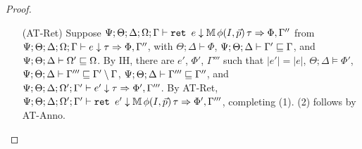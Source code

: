 \begin{proof}
\begin{itemize}
  \item[(AT-Ret)] Suppose
  $\Psi ; \Theta ; \Delta ; \Omega ; \Gamma \vdash \texttt{ret } e \downarrow \mathbb{M} \, \phi(I,\vec{p}) \, \tau \Rightarrow \Phi, \Gamma''$ from
  $\Psi ; \Theta ; \Delta ; \Omega ; \Gamma \vdash e \downarrow \tau \Rightarrow \Phi,\Gamma''$, with
  $\Theta ; \Delta \vdash \Phi$,
  $\Psi ; \Theta ; \Delta \vdash \Gamma' \sqsubseteq \Gamma$, and
  $\Psi ; \Theta ; \Delta \vdash \Omega' \sqsubseteq \Omega$.
  By IH, there are $e'$, $\Phi'$, $\Gamma'''$ such that 
  $|e'| = |e|$,
  $\Theta ; \Delta \vDash \Phi'$,
  $\Psi ;  \Theta ; \Delta \vdash \Gamma''' \sqsubseteq \Gamma' \setminus \Gamma$,
  $\Psi ;  \Theta ; \Delta \vdash \Gamma''' \sqsubseteq \Gamma''$, and
  $\Psi ; \Theta ; \Delta ; \Omega' ; \Gamma' \vdash e' \downarrow \tau \Rightarrow \Phi',\Gamma'''$.
  By AT-Ret,
  $\Psi ; \Theta ; \Delta ; \Omega' ; \Gamma' \vdash \texttt{ret } e' \downarrow \mathbb{M} \, \phi(I,\vec{p})\, \tau \Rightarrow \Phi',\Gamma'''$,
  completing (1). (2) follows by AT-Anno.
  


\end{itemize}
\end{proof}
